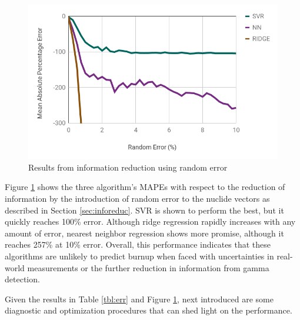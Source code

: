 \begin{figure}[!htb]
  \centering
  \includegraphics[width=\linewidth]{./chapters/demo_method/randerr.png}
  \caption{Results from information reduction using random error}
  \label{fig:randerr}
\end{figure}

Figure \ref{fig:randerr} shows the three algorithm's \gls{MAPE}s with respect
to the reduction of information by the introduction of random error to the
nuclide vectors as described in Section \ref{sec:inforeduc}.  \gls{SVR} is
shown to perform the best, but it quickly reaches 100\% error.  Although ridge
regression rapidly increases with any amount of error, nearest neighbor
regression shows more promise, although it reaches 257\% at 10\% error.
Overall, this performance indicates that these algorithms are unlikely to
predict burnup when faced with uncertainties in real-world measurements or
the further reduction in information from gamma detection.

Given the results in Table \ref{tbl:err} and Figure \ref{fig:randerr}, next
introduced are some diagnostic and optimization procedures that can shed light
on the performance.
